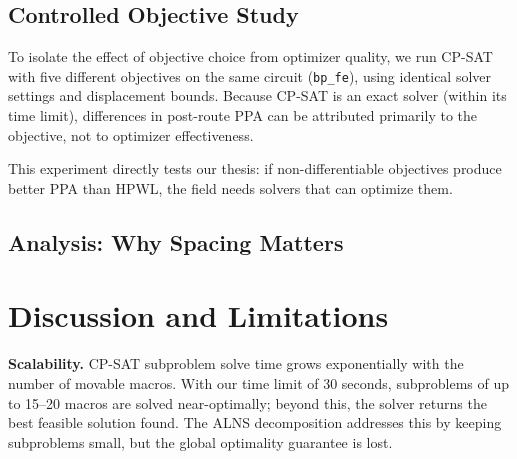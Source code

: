 \documentclass[sigconf,anonymous,review,9pt]{acmart}
\begin{document}


\subsection{Controlled Objective Study}
\label{subsec:objective_study}

To isolate the effect of objective choice from optimizer quality, we run CP-SAT with five different objectives on the same circuit (\texttt{bp\_fe}), using identical solver settings and displacement bounds. Because CP-SAT is an exact solver (within its time limit), differences in post-route PPA can be attributed primarily to the objective, not to optimizer effectiveness.


This experiment directly tests our thesis: if non-differentiable objectives produce better PPA than HPWL, the field needs solvers that can optimize them.


\subsection{Analysis: Why Spacing Matters}
\label{subsec:analysis}



\section{Discussion and Limitations}
\label{sec:discussion}

\textbf{Scalability.} CP-SAT subproblem solve time grows exponentially with the number of movable macros. With our time limit of 30 seconds, subproblems of up to 15--20 macros are solved near-optimally; beyond this, the solver returns the best feasible solution found. The ALNS decomposition addresses this by keeping subproblems small, but the global optimality guarantee is lost.
\end{document}
